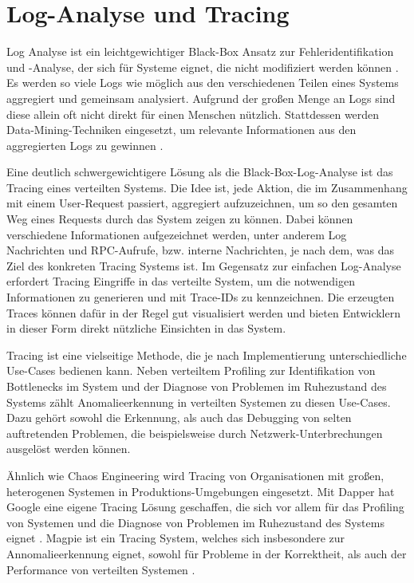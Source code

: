 \documentclass[12pt,a4paper]{report}
\begin{document}
\section{Log-Analyse und Tracing}
Log Analyse ist ein leichtgewichtiger Black-Box Ansatz zur Fehleridentifikation und -Analyse, der sich für Systeme eignet, die
nicht modifiziert werden können \cite{challenges_and_options}. Es werden so viele Logs wie möglich aus den
verschiedenen Teilen eines Systems aggregiert und gemeinsam analysiert. Aufgrund der großen Menge an Logs sind diese allein oft
nicht direkt für einen Menschen nützlich. Stattdessen werden Data-Mining-Techniken eingesetzt, um relevante Informationen aus den
aggregierten Logs zu gewinnen \cite{log_analysis_at_google}.

Eine deutlich schwergewichtigere Lösung als die Black-Box-Log-Analyse ist das Tracing eines verteilten Systems. Die Idee ist, jede
Aktion, die im Zusammenhang mit einem User-Request passiert, aggregiert aufzuzeichnen, um so den gesamten Weg eines Requests durch
das System zeigen zu können. Dabei können verschiedene Informationen aufgezeichnet werden, unter anderem Log Nachrichten und
RPC-Aufrufe, bzw. interne Nachrichten, je nach dem, was das Ziel des konkreten Tracing Systems ist. Im Gegensatz zur einfachen
Log-Analyse erfordert Tracing Eingriffe in das verteilte System, um die notwendigen Informationen zu generieren und mit Trace-IDs
zu kennzeichnen. Die erzeugten Traces können dafür in der Regel gut visualisiert werden und bieten Entwicklern in dieser Form
direkt nützliche Einsichten in das System. \cite{dapper_tracing}

Tracing ist eine vielseitige Methode, die je nach Implementierung unterschiedliche Use-Cases bedienen kann. Neben verteiltem
Profiling zur Identifikation von Bottlenecks im System und der Diagnose von Problemen im Ruhezustand des Systems zählt
Anomalieerkennung in verteilten Systemen zu diesen Use-Cases. Dazu gehört sowohl die Erkennung, als auch das Debugging von selten
auftretenden Problemen, die beispielsweise durch Netzwerk-Unterbrechungen ausgelöst werden können. \cite{so_you_want_to_trace}

Ähnlich wie Chaos Engineering wird Tracing von Organisationen mit großen, heterogenen Systemen in Produktions-Umgebungen
eingesetzt. Mit Dapper \cite{dapper_tracing} hat Google eine eigene Tracing Lösung geschaffen, die sich vor allem für das
Profiling von Systemen und die Diagnose von Problemen im Ruhezustand des Systems eignet \cite{so_you_want_to_trace}. Magpie
\cite{magpie_tracing} ist ein Tracing System, welches sich insbesondere zur Annomalieerkennung eignet, sowohl für Probleme in der
Korrektheit, als auch der Performance von verteilten Systemen \cite{so_you_want_to_trace}.
\end{document}
